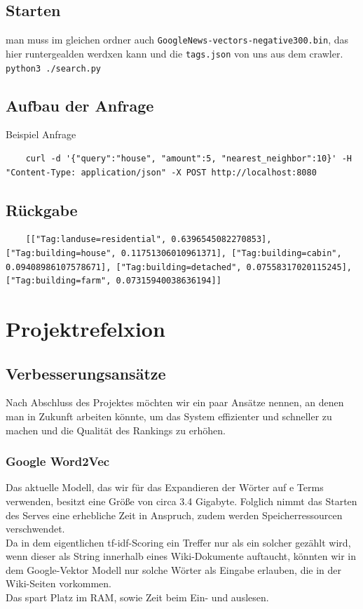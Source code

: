 \documentclass[12pt,pdftex,a4paper]{article}
\begin{document}
\subsection{Starten}
man muss im gleichen ordner auch \texttt{GoogleNews-vectors-negative300.bin}, das hier runtergealden werdxen kann \cite{googleword2vec} und die \texttt{tags.json} von uns aus dem crawler.\\
\texttt{python3 ./search.py}
\subsection{Aufbau der Anfrage}
Beispiel Anfrage
\begin{lstlisting}
	curl -d '{"query":"house", "amount":5, "nearest_neighbor":10}' -H "Content-Type: application/json" -X POST http://localhost:8080
\end{lstlisting}
\subsection{Rückgabe}
\begin{lstlisting}
	[["Tag:landuse=residential", 0.6396545082270853], ["Tag:building=house", 0.11751306010961371], ["Tag:building=cabin", 0.09408986107578671], ["Tag:building=detached", 0.07558317020115245], ["Tag:building=farm", 0.07315940038636194]]
\end{lstlisting}

\section{Projektrefelxion}
\subsection{Verbesserungsansätze}
Nach Abschluss des Projektes möchten wir ein paar Ansätze nennen, an denen man in Zukunft arbeiten könnte, um das System effizienter und schneller zu machen und die Qualität des Rankings zu erhöhen.
\subsubsection{Google Word2Vec}
Das aktuelle Modell, das wir für das Expandieren der Wörter auf e Terms verwenden, besitzt eine Größe von circa 3.4 Gigabyte. Folglich nimmt das Starten des Serves eine erhebliche Zeit in Anspruch, zudem werden Speicherressourcen verschwendet.\\
Da in dem eigentlichen tf-idf-Scoring ein Treffer nur als ein solcher gezählt wird, wenn dieser als String innerhalb eines Wiki-Dokumente auftaucht, könnten wir in dem Google-Vektor Modell nur solche Wörter als Eingabe erlauben, die in der Wiki-Seiten vorkommen.\\
Das spart Platz im RAM, sowie Zeit beim Ein- und auslesen.
\end{document}
